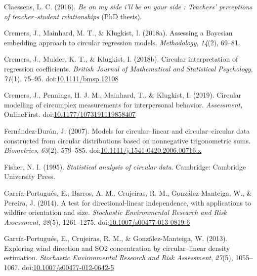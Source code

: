 \documentclass[man,mask]{apa6}
\begin{document}
\leavevmode\hypertarget{ref-Claessens2016side}{}%
Claessens, L. C. (2016). \emph{Be on my side i'll be on your side : Teachers' perceptions of teacher--student relationships} (PhD thesis).

\leavevmode\hypertarget{ref-Cremers2018Assessing}{}%
Cremers, J., Mainhard, M. T., \& Klugkist, I. (2018a). Assessing a Bayesian embedding approach to circular regression models. \emph{Methodology}, \emph{14}(2), 69--81.

\leavevmode\hypertarget{ref-CremersMulderKlugkist2017}{}%
Cremers, J., Mulder, K. T., \& Klugkist, I. (2018b). Circular interpretation of regression coefficients. \emph{British Journal of Mathematical and Statistical Psychology}, \emph{71}(1), 75--95. doi:\href{https://doi.org/10.1111/bmsp.12108}{10.1111/bmsp.12108}

\leavevmode\hypertarget{ref-cremers2019circular}{}%
Cremers, J., Pennings, H. J. M., Mainhard, T., \& Klugkist, I. (2019). Circular modelling of circumplex measurements for interpersonal behavior. \emph{Assessment}, OnlineFirst. doi:\href{https://doi.org/10.1177/1073191119858407}{10.1177/1073191119858407}

\leavevmode\hypertarget{ref-fernandez2007models}{}%
Fernández-Durán, J. (2007). Models for circular--linear and circular--circular data constructed from circular distributions based on nonnegative trigonometric sums. \emph{Biometrics}, \emph{63}(2), 579--585. doi:\href{https://doi.org/10.1111/j.1541-0420.2006.00716.x}{10.1111/j.1541-0420.2006.00716.x}

\leavevmode\hypertarget{ref-fisher1995statistical}{}%
Fisher, N. I. (1995). \emph{Statistical analysis of circular data}. Cambridge: Cambridge University Press.

\leavevmode\hypertarget{ref-garcia2014test}{}%
García-Portugués, E., Barros, A. M., Crujeiras, R. M., González-Manteiga, W., \& Pereira, J. (2014). A test for directional-linear independence, with applications to wildfire orientation and size. \emph{Stochastic Environmental Research and Risk Assessment}, \emph{28}(5), 1261--1275. doi:\href{https://doi.org/10.1007/s00477-013-0819-6}{10.1007/s00477-013-0819-6}

\leavevmode\hypertarget{ref-garcia2013exploring}{}%
García-Portugués, E., Crujeiras, R. M., \& González-Manteiga, W. (2013). Exploring wind direction and SO2 concentration by circular--linear density estimation. \emph{Stochastic Environmental Research and Risk Assessment}, \emph{27}(5), 1055--1067. doi:\href{https://doi.org/10.1007/s00477-012-0642-5}{10.1007/s00477-012-0642-5}
\end{document}
